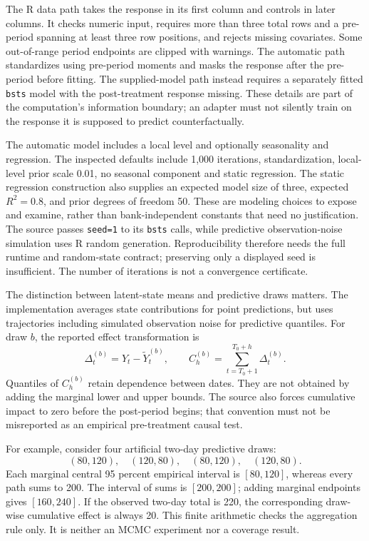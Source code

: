 The R data path takes the response in its first column and controls in later
columns. It checks numeric input, requires more than three total rows and a
pre-period spanning at least three row positions, and rejects missing
covariates. Some out-of-range period endpoints are clipped with warnings.
The automatic path standardizes using pre-period moments and masks the
response after the pre-period before fitting. The supplied-model path instead
requires a separately fitted \texttt{bsts} model with the post-treatment
response missing. These details are part of the computation's information
boundary; an adapter must not silently train on the response it is supposed
to predict counterfactually. \citep{exec13_ci_semantics}

The automatic model includes a local level and optionally seasonality and
regression. The inspected defaults include 1,000 iterations, standardization,
local-level prior scale 0.01, no seasonal component and static regression.
The static regression construction also supplies an expected model size of
three, expected \(R^2=0.8\), and prior degrees of freedom 50. These are
modeling choices to expose and examine, rather than bank-independent
constants that need no justification. The source passes \texttt{seed=1} to
its \texttt{bsts} calls, while predictive observation-noise simulation uses R
random generation. Reproducibility therefore needs the full runtime and
random-state contract; preserving only a displayed seed is insufficient.
The number of iterations is not a convergence certificate.
\citep{exec13_ci_semantics}

The distinction between latent-state means and predictive draws matters.
The implementation averages state contributions for point predictions, but
uses trajectories including simulated observation noise for predictive
quantiles. For draw \(b\), the reported effect transformation is
\[
 \Delta_t^{(b)}=Y_t-\widetilde Y_t^{(b)},\qquad
 C_h^{(b)}=\sum_{t=T_0+1}^{T_0+h}\Delta_t^{(b)}.
\]
Quantiles of \(C_h^{(b)}\) retain dependence between dates. They are not
obtained by adding the marginal lower and upper bounds. The source also
forces cumulative impact to zero before the post-period begins; that
convention must not be misreported as an empirical pre-treatment causal
test. \citep{exec13_ci_semantics,exec13_ci_brodersen2015}

For example, consider four artificial two-day predictive draws:
\[
(80,120),\quad(120,80),\quad(80,120),\quad(120,80).
\]
Each marginal central 95 percent
empirical interval is \([80,120]\), whereas every path sums to 200. The
interval of sums is \([200,200]\); adding marginal endpoints gives
\([160,240]\). If the observed two-day total is 220, the corresponding
draw-wise cumulative effect is always 20. This finite arithmetic checks the
aggregation rule only. It is neither an MCMC experiment nor a coverage result.
\citep{exec13_cimpact_examples}

